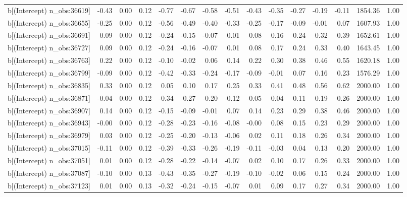 \begin{table}[ht]
\begin{tabular}{rrrrrrrrrrrrrrr}
  b[(Intercept) n\_obs:36619] & -0.43 & 0.00 & 0.12 & -0.77 & -0.67 & -0.58 & -0.51 & -0.43 & -0.35 & -0.27 & -0.19 & -0.11 & 1854.36 & 1.00 \\ 
  b[(Intercept) n\_obs:36655] & -0.25 & 0.00 & 0.12 & -0.56 & -0.49 & -0.40 & -0.33 & -0.25 & -0.17 & -0.09 & -0.01 & 0.07 & 1607.93 & 1.00 \\ 
  b[(Intercept) n\_obs:36691] & 0.09 & 0.00 & 0.12 & -0.24 & -0.15 & -0.07 & 0.01 & 0.08 & 0.16 & 0.24 & 0.32 & 0.39 & 1652.61 & 1.00 \\ 
  b[(Intercept) n\_obs:36727] & 0.09 & 0.00 & 0.12 & -0.24 & -0.16 & -0.07 & 0.01 & 0.08 & 0.17 & 0.24 & 0.33 & 0.40 & 1643.45 & 1.00 \\ 
  b[(Intercept) n\_obs:36763] & 0.22 & 0.00 & 0.12 & -0.10 & -0.02 & 0.06 & 0.14 & 0.22 & 0.30 & 0.38 & 0.46 & 0.55 & 1620.18 & 1.00 \\ 
  b[(Intercept) n\_obs:36799] & -0.09 & 0.00 & 0.12 & -0.42 & -0.33 & -0.24 & -0.17 & -0.09 & -0.01 & 0.07 & 0.16 & 0.23 & 1576.29 & 1.00 \\ 
  b[(Intercept) n\_obs:36835] & 0.33 & 0.00 & 0.12 & 0.05 & 0.10 & 0.17 & 0.25 & 0.33 & 0.41 & 0.48 & 0.56 & 0.62 & 2000.00 & 1.00 \\ 
  b[(Intercept) n\_obs:36871] & -0.04 & 0.00 & 0.12 & -0.34 & -0.27 & -0.20 & -0.12 & -0.05 & 0.04 & 0.11 & 0.19 & 0.26 & 2000.00 & 1.00 \\ 
  b[(Intercept) n\_obs:36907] & 0.14 & 0.00 & 0.12 & -0.15 & -0.09 & -0.01 & 0.07 & 0.14 & 0.23 & 0.29 & 0.38 & 0.46 & 2000.00 & 1.00 \\ 
  b[(Intercept) n\_obs:36943] & -0.00 & 0.00 & 0.12 & -0.28 & -0.23 & -0.16 & -0.08 & -0.00 & 0.08 & 0.15 & 0.23 & 0.29 & 2000.00 & 1.00 \\ 
  b[(Intercept) n\_obs:36979] & 0.03 & 0.00 & 0.12 & -0.25 & -0.20 & -0.13 & -0.06 & 0.02 & 0.11 & 0.18 & 0.26 & 0.34 & 2000.00 & 1.00 \\ 
  b[(Intercept) n\_obs:37015] & -0.11 & 0.00 & 0.12 & -0.39 & -0.33 & -0.26 & -0.19 & -0.11 & -0.03 & 0.04 & 0.13 & 0.20 & 2000.00 & 1.00 \\ 
  b[(Intercept) n\_obs:37051] & 0.01 & 0.00 & 0.12 & -0.28 & -0.22 & -0.14 & -0.07 & 0.02 & 0.10 & 0.17 & 0.26 & 0.33 & 2000.00 & 1.00 \\ 
  b[(Intercept) n\_obs:37087] & -0.10 & 0.00 & 0.13 & -0.43 & -0.35 & -0.27 & -0.19 & -0.10 & -0.02 & 0.06 & 0.15 & 0.24 & 2000.00 & 1.00 \\ 
  b[(Intercept) n\_obs:37123] & 0.01 & 0.00 & 0.13 & -0.32 & -0.24 & -0.15 & -0.07 & 0.01 & 0.09 & 0.17 & 0.27 & 0.34 & 2000.00 & 1.00 \\ 

\end{tabular}
\end{table}
